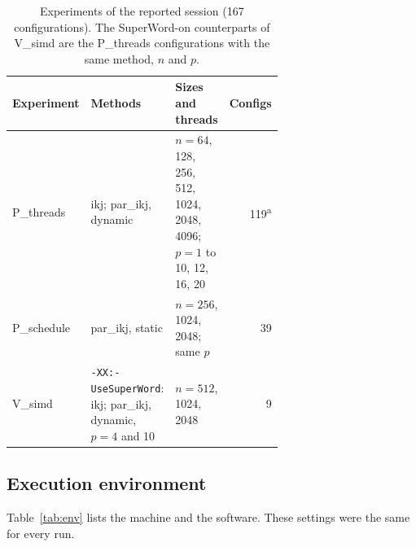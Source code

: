 \documentclass[11pt,a4paper]{article}
\begin{document}
\begin{table}[tbp]
\centering
\caption{Experiments of the reported session (167 configurations). The
SuperWord-on counterparts of V\_simd are the P\_threads configurations with the
same method, $n$ and $p$.}
\label{tab:experiments}
\small
\begin{tabular}{@{}l>{\raggedright\arraybackslash}p{0.3\linewidth}>{\raggedright\arraybackslash}p{0.36\linewidth}r@{}}
\toprule
Experiment & Methods & Sizes and threads & Configs \\
\midrule
P\_threads & ikj; par\_ikj, dynamic & $n=64$, 128, 256, 512, 1024, 2048, 4096; $p=1$ to 10, 12, 16, 20 & 119\textsuperscript{a} \\
P\_schedule & par\_ikj, static & $n=256$, 1024, 2048; same $p$ & 39 \\
V\_simd & \texttt{-XX:-UseSuperWord}: ikj; par\_ikj, dynamic, $p=4$ and 10 & $n=512$, 1024, 2048 & 9 \\
\bottomrule
\end{tabular}
\par{}
\end{table}

\subsection{Execution environment}

Table~\ref{tab:env} lists the machine and the software. These settings were
the same for every run.
\end{document}
